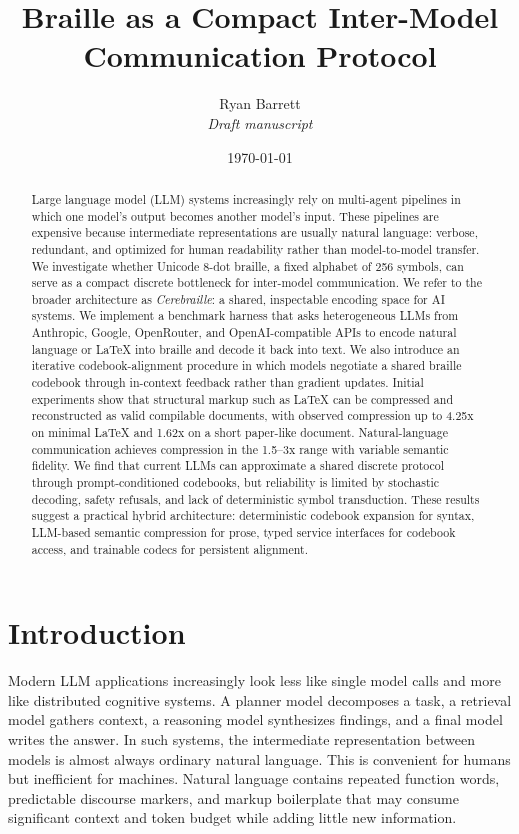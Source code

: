 \documentclass[11pt]{article}
\title{Braille as a Compact Inter-Model Communication Protocol}
\author{Ryan Barrett \\ \textit{Draft manuscript}}
\date{\today}
\begin{document}
\maketitle

\begin{abstract}
Large language model (LLM) systems increasingly rely on multi-agent pipelines in which one model's output becomes another model's input. These pipelines are expensive because intermediate representations are usually natural language: verbose, redundant, and optimized for human readability rather than model-to-model transfer. We investigate whether Unicode 8-dot braille, a fixed alphabet of 256 symbols, can serve as a compact discrete bottleneck for inter-model communication. We refer to the broader architecture as \emph{Cerebraille}: a shared, inspectable encoding space for AI systems. We implement a benchmark harness that asks heterogeneous LLMs from Anthropic, Google, OpenRouter, and OpenAI-compatible APIs to encode natural language or LaTeX into braille and decode it back into text. We also introduce an iterative codebook-alignment procedure in which models negotiate a shared braille codebook through in-context feedback rather than gradient updates. Initial experiments show that structural markup such as LaTeX can be compressed and reconstructed as valid compilable documents, with observed compression up to 4.25x on minimal LaTeX and 1.62x on a short paper-like document. Natural-language communication achieves compression in the 1.5--3x range with variable semantic fidelity. We find that current LLMs can approximate a shared discrete protocol through prompt-conditioned codebooks, but reliability is limited by stochastic decoding, safety refusals, and lack of deterministic symbol transduction. These results suggest a practical hybrid architecture: deterministic codebook expansion for syntax, LLM-based semantic compression for prose, typed service interfaces for codebook access, and trainable codecs for persistent alignment.
\end{abstract}

\section{Introduction}
Modern LLM applications increasingly look less like single model calls and more like distributed cognitive systems. A planner model decomposes a task, a retrieval model gathers context, a reasoning model synthesizes findings, and a final model writes the answer. In such systems, the intermediate representation between models is almost always ordinary natural language. This is convenient for humans but inefficient for machines. Natural language contains repeated function words, predictable discourse markers, and markup boilerplate that may consume significant context and token budget while adding little new information.
\end{document}
